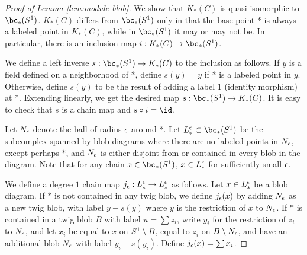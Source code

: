 \begin{proof}[Proof of Lemma \ref{lem:module-blob}]
We show that $K_*(C)$ is quasi-isomorphic to $\bc_*(S^1)$.
$K_*(C)$ differs from $\bc_*(S^1)$ only in that the base point *
is always a labeled point in $K_*(C)$, while in $\bc_*(S^1)$ it may or may not be.
In particular, there is an inclusion map $i: K_*(C) \to \bc_*(S^1)$.

We define a left inverse $s: \bc_*(S^1) \to K_*(C)$ to the inclusion as follows.
If $y$ is a field defined on a neighborhood of *, define $s(y) = y$ if
* is a labeled point in $y$.
Otherwise, define $s(y)$ to be the result of adding a label 1 (identity morphism) at *.
Extending linearly, we get the desired map $s: \bc_*(S^1) \to K_*(C)$.
It is easy to check that $s$ is a chain map and $s \circ i = \id$.

Let $N_\epsilon$ denote the ball of radius $\epsilon$ around *.
Let $L_*^\ep \sub \bc_*(S^1)$ be the subcomplex 
spanned by blob diagrams
where there are no labeled points
in $N_\epsilon$, except perhaps $*$, and $N_\epsilon$ is either disjoint from or contained in 
every blob in the diagram.
Note that for any chain $x \in \bc_*(S^1)$, $x \in L_*^\epsilon$ for sufficiently small $\epsilon$.

We define a degree $1$ chain map $j_\epsilon: L_*^\epsilon \to L_*^\epsilon$ as follows. Let $x \in L_*^\epsilon$ be a blob diagram.
If $*$ is not contained in any twig blob, we define $j_\epsilon(x)$ by adding $N_\epsilon$ as a new twig blob, with label $y - s(y)$ where $y$ is the restriction
of $x$ to $N_\epsilon$. If $*$ is contained in a twig blob $B$ with label $u=\sum z_i$,
write $y_i$ for the restriction of $z_i$ to $N_\epsilon$, and let
$x_i$ be equal to $x$ on $S^1 \setminus B$, equal to $z_i$ on $B \setminus N_\epsilon$,
and have an additional blob $N_\epsilon$ with label $y_i - s(y_i)$.
Define $j_\epsilon(x) = \sum x_i$.
\end{proof}
